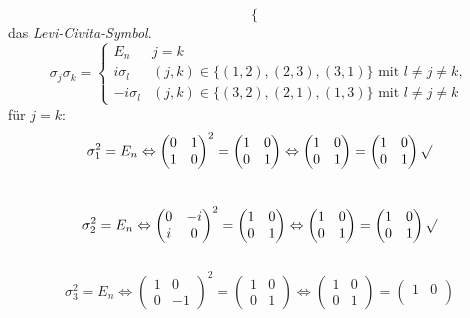 \documentclass{HM}
\begin{document}
\begin{enumerate}
$$\begin{cases}
\end{cases}$$
das \textit{Levi-Civita-Symbol}.
$$\sigma_j\sigma_k=\begin{cases}
E_n &j=k\\
i\sigma_l &(j,k)\in\lbrace(1,2),(2,3),(3,1)\rbrace \text{ mit } l\neq j\neq k,\\
-i\sigma_l &(j,k)\in\lbrace(3,2),(2,1),(1,3)\rbrace \text{ mit } l\neq j\neq k
\end{cases}$$
für $j=k$:
$$\sigma_1^2 = E_n \Leftrightarrow \begin{pmatrix}
0&1\\
1&0
\end{pmatrix}^2 = \begin{pmatrix}
1&0\\
0&1
\end{pmatrix} \Leftrightarrow \begin{pmatrix}
1&0\\
0&1
\end{pmatrix}=\begin{pmatrix}
1&0\\
0&1
\end{pmatrix} \surd$$\\
$$\sigma_2^2 = E_n \Leftrightarrow \begin{pmatrix}
0&-i\\
i&0
\end{pmatrix}^2 = \begin{pmatrix}
1&0\\
0&1
\end{pmatrix} \Leftrightarrow \begin{pmatrix}
1&0\\
0&1
\end{pmatrix}=\begin{pmatrix}
1&0\\
0&1
\end{pmatrix} \surd$$\\
$$\sigma_3^2 = E_n \Leftrightarrow \begin{pmatrix}
1&0\\
0&-1
\end{pmatrix}^2 = \begin{pmatrix}
1&0\\
0&1
\end{pmatrix} \Leftrightarrow \begin{pmatrix}
1&0\\
0&1
\end{pmatrix}=\begin{pmatrix}
1&0\\

\end{pmatrix}$$
\end{enumerate}
\end{document}
